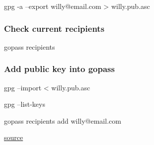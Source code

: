 \documentclass[9pt,english,a4paper,]{scrartcl}
\newenvironment{Shaded}{}{}
\newcommand{\ExtensionTok}[1]{#1}
\newcommand{\NormalTok}[1]{#1}
\newcommand{\OperatorTok}[1]{\textcolor[rgb]{0.40,0.40,0.40}{#1}}
\begin{document}
\begin{multicols}{3}
\begin{Shaded}
\begin{Highlighting}[]
\ExtensionTok{gpg}\NormalTok{ -a --export willy@email.com }\OperatorTok{>}\NormalTok{ willy.pub.asc}
\end{Highlighting}
\end{Shaded}

\hypertarget{check-current-recipients}{%
\subsubsection{Check current
recipients}\label{check-current-recipients}}

\begin{Shaded}
\begin{Highlighting}[]
\ExtensionTok{gopass}\NormalTok{ recipients}
\end{Highlighting}
\end{Shaded}

\hypertarget{add-public-key-into-gopass}{%
\subsubsection{Add public key into
gopass}\label{add-public-key-into-gopass}}

\begin{Shaded}
\begin{Highlighting}[]
\ExtensionTok{gpg}\NormalTok{ --import }\OperatorTok{<}\NormalTok{ willy.pub.asc}
\end{Highlighting}
\end{Shaded}

\begin{Shaded}
\begin{Highlighting}[]
\ExtensionTok{gpg}\NormalTok{ --list-keys}
\end{Highlighting}
\end{Shaded}

\begin{Shaded}
\begin{Highlighting}[]
\ExtensionTok{gopass}\NormalTok{ recipients add willy@email.com}
\end{Highlighting}
\end{Shaded}

\href{https://github.com/Woile/gopass-cheat-sheet}{source}
\end{multicols}
\end{document}
